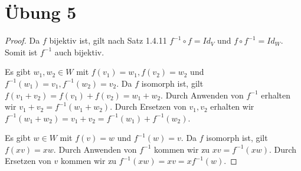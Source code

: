 \documentclass[a4paper,10pt]{article}
\begin{document}
\section*{Übung 5}

\begin{proof}
 Da $f$ bijektiv ist, gilt nach Satz 1.4.11 $f^{-1} \circ f = Id_V$ und $f \circ f^{-1} = Id_W$.
 Somit ist $f^{-1}$ auch bijektiv.
 
 Es gibt $w_1, w_2 \in W$ mit $f(v_1) = w_1, f(v_2) = w_2$ und $f^{-1}(w_1) = v_1, f^{-1}(w_2) = v_2$.
 Da $f$ isomorph ist, gilt $f(v_1 + v_2) = f(v_1) + f(v_2) = w_1 + w_2$.
 Durch Anwenden von $f^{-1}$ erhalten wir $v_1 + v_2 = f^{-1}(w_1 + w_2)$.
 Durch Ersetzen von $v_1, v_2$ erhalten wir $f^{-1}(w_1 + w_2) = v_1 + v_2 = f^{-1}(w_1) + f^{-1}(w_2)$.
 
 Es gibt $w \in W$ mit $f(v) = w$ und $f^{-1}(w) = v$.
 Da $f$ isomorph ist, gilt $f(xv) = xw$.
 Durch Anwenden von $f^{-1}$ kommen wir zu $xv = f^{-1}(xw)$.
 Durch Ersetzen von $v$ kommen wir zu $f^{-1}(xw) = xv = xf^{-1}(w)$.
\end{proof}
\end{document}
